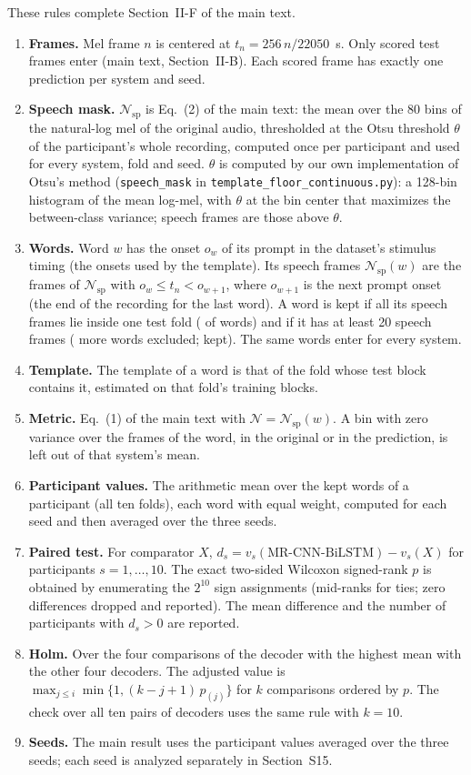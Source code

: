 \documentclass[10pt,a4paper]{article}
\begin{document}
These rules complete Section~II-F of the main text.
\begin{enumerate}
\item \textbf{Frames.} Mel frame $n$ is centered at $t_n=256\,n/22050$~s. Only scored test frames enter (main text, Section~II-B). Each scored frame has exactly one prediction per system and seed.
\item \textbf{Speech mask.} $\mathcal{N}_\mathrm{sp}$ is Eq.~(2) of the main text: the mean over the 80 bins of the natural-log mel of the original audio, thresholded at the Otsu threshold $\theta$ of the participant's whole recording, computed once per participant and used for every system, fold and seed. $\theta$ is computed by our own implementation of Otsu's method (\texttt{speech\_mask} in \texttt{template\_floor\_continuous.py}): a 128-bin histogram of the mean log-mel, with $\theta$ at the bin center that maximizes the between-class variance; speech frames are those above $\theta$.
\item \textbf{Words.} Word $w$ has the onset $o_w$ of its prompt in the dataset's stimulus timing (the onsets used by the template). Its speech frames $\mathcal{N}_\mathrm{sp}(w)$ are the frames of $\mathcal{N}_\mathrm{sp}$ with $o_w\le t_n<o_{w+1}$, where $o_{w+1}$ is the next prompt onset (the end of the recording for the last word). A word is kept if all its speech frames lie inside one test fold (\NWWordsFold{} of \NXTotalTrials{} words) and if it has at least 20 speech frames (\NWWordsShort{} more words excluded; \NWWords{} kept). The same words enter for every system.
\item \textbf{Template.} The template of a word is that of the fold whose test block contains it, estimated on that fold's training blocks.
\item \textbf{Metric.} Eq.~(1) of the main text with $\mathcal{N}=\mathcal{N}_\mathrm{sp}(w)$. A bin with zero variance over the frames of the word, in the original or in the prediction, is left out of that system's mean.
\item \textbf{Participant values.} The arithmetic mean over the kept words of a participant (all ten folds), each word with equal weight, computed for each seed and then averaged over the three seeds.
\item \textbf{Paired test.} For comparator $X$, $d_s=v_s(\text{MR-CNN-BiLSTM})-v_s(X)$ for participants $s=1,\dots,10$. The exact two-sided Wilcoxon signed-rank $p$ is obtained by enumerating the $2^{10}$ sign assignments (mid-ranks for ties; zero differences dropped and reported). The mean difference and the number of participants with $d_s>0$ are reported.
\item \textbf{Holm.} Over the four comparisons of the decoder with the highest mean with the other four decoders. The adjusted value is $\max_{j\le i}\min\{1,(k-j+1)\,p_{(j)}\}$ for $k$ comparisons ordered by $p$. The check over all ten pairs of decoders uses the same rule with $k=10$.
\item \textbf{Seeds.} The main result uses the participant values averaged over the three seeds; each seed is analyzed separately in Section~S15.
\end{enumerate}
\end{document}
